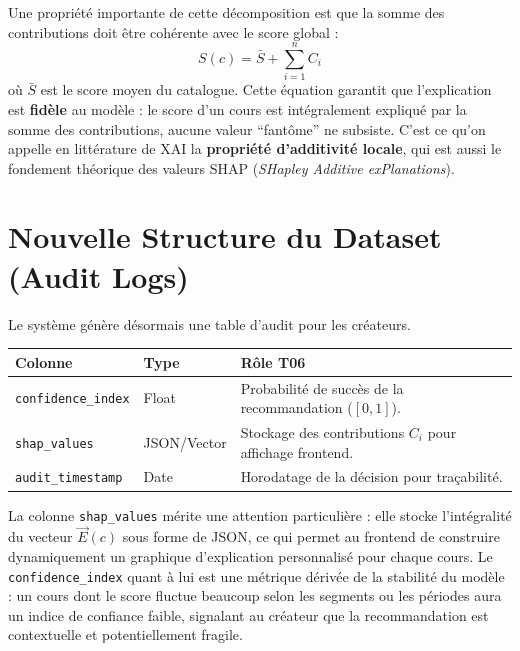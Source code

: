 \documentclass[11pt,a4paper]{article}
\begin{document}
Une propriété importante de cette décomposition est que la somme des contributions doit être cohérente avec le score global :
\begin{equation}
S(c) = \bar{S} + \sum_{i=1}^{n} C_i
\end{equation}
où $\bar{S}$ est le score moyen du catalogue. Cette équation garantit que l'explication est \textbf{fidèle} au modèle : le score d'un cours est intégralement expliqué par la somme des contributions, aucune valeur ``fantôme'' ne subsiste. C'est ce qu'on appelle en littérature de XAI la \textbf{propriété d'additivité locale}, qui est aussi le fondement théorique des valeurs SHAP (\textit{SHapley Additive exPlanations}).

\section{Nouvelle Structure du Dataset (Audit Logs)}
Le système génère désormais une table d'audit pour les créateurs.

\begin{table}[h!]
\centering
\begin{tabular}{|l|l|p{7cm}|}
\hline
\rowcolor{BrandDark} \color{white} Colonne & \color{white} Type & \color{white} Rôle T06 \\ \hline
\texttt{confidence\_index} & Float & Probabilité de succès de la recommandation ($[0,1]$). \\ \hline
\texttt{shap\_values} & JSON/Vector & Stockage des contributions $C_i$ pour affichage frontend. \\ \hline
\texttt{audit\_timestamp} & Date & Horodatage de la décision pour traçabilité. \\ \hline
\end{tabular}
\end{table}

La colonne \texttt{shap\_values} mérite une attention particulière : elle stocke l'intégralité du vecteur $\vec{E}(c)$ sous forme de JSON, ce qui permet au frontend de construire dynamiquement un graphique d'explication personnalisé pour chaque cours. Le \texttt{confidence\_index} quant à lui est une métrique dérivée de la stabilité du modèle : un cours dont le score fluctue beaucoup selon les segments ou les périodes aura un indice de confiance faible, signalant au créateur que la recommandation est contextuelle et potentiellement fragile.
\end{document}
